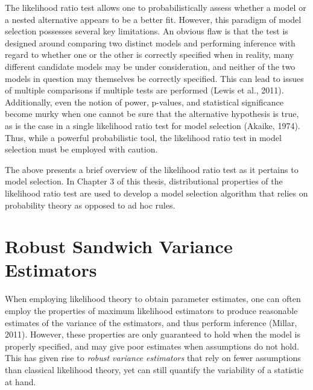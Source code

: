 		The likelihood ratio test allows one to probabilistically assess whether a model or a nested alternative appears to be a better fit. However, this paradigm of model selection possesses
		several key limitations. An obvious flaw is that the test is designed around comparing two distinct models and performing inference with regard to whether one or the other is 
		correctly specified when in reality, many different candidate models may be under consideration, and neither of the two models in question may themselves be correctly specified. 
		This can lead to issues of multiple comparisons if multiple tests are performed (Lewis et al., 2011). Additionally, even the notion of power, p-values, and statistical significance 
		become murky when one cannot be sure that the alternative hypothesis is true, as is the case in a single likelihood ratio test for model selection (Akaike, 1974). Thus, while a powerful
		probabilistic tool, the likelihood ratio test in model selection must be employed with caution.

		The above presents a brief overview of the likelihood ratio test as it pertains to model selection. In Chapter 3 of this thesis, distributional properties of the likelihood ratio test are
		used to develop a model selection algorithm that relies on probability theory as opposed to ad hoc rules.

		\section{Robust Sandwich Variance Estimators}

		When employing likelihood theory to obtain parameter estimates, one can often employ the properties of maximum likelihood estimators to produce reasonable estimates of the variance of the
		estimators, and thus perform inference (Millar, 2011). However, these properties are only guaranteed to hold when the model is properly specified, and may give poor estimates when assumptions
		do not hold. This has given rise to \textit{robust variance estimators} that rely on fewer assumptions than classical likelihood theory, yet can still quantify the variability of a statistic
		at hand.

